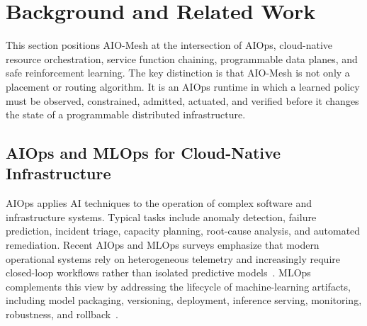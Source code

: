 \documentclass[final,5p]{elsarticle}
\begin{document}



\section{Background and Related Work}
\label{sec:related}

This section positions AIO-Mesh at the intersection of AIOps, cloud-native resource orchestration, service function chaining, programmable data planes, and safe reinforcement learning. The key distinction is that AIO-Mesh is not only a placement or routing algorithm. It is an AIOps runtime in which a learned policy must be observed, constrained, admitted, actuated, and verified before it changes the state of a programmable distributed infrastructure.

\subsection{AIOps and MLOps for Cloud-Native Infrastructure}
\label{subsec:related_aiops}

AIOps applies AI techniques to the operation of complex software and infrastructure systems. Typical tasks include anomaly detection, failure prediction, incident triage, capacity planning, root-cause analysis, and automated remediation. Recent AIOps and MLOps surveys emphasize that modern operational systems rely on heterogeneous telemetry and increasingly require closed-loop workflows rather than isolated predictive models~\cite{diazdearcaya2024joint,zhang2025aiopsllm}. MLOps complements this view by addressing the lifecycle of machine-learning artifacts, including model packaging, versioning, deployment, inference serving, monitoring, robustness, and rollback~\cite{kreuzberger2023mlops,eken2025mlops,bayram2025trustworthy}.
\end{document}
